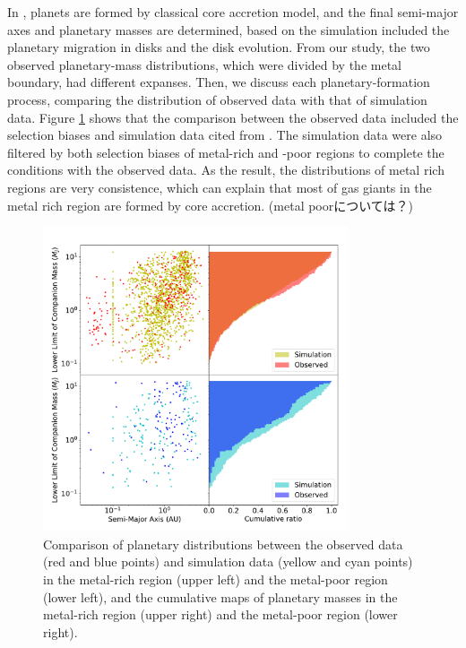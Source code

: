 \documentclass[twocolumn, dvipdfmx]{aastex62}
\begin{document}
\begin{CJK*}{UTF8}{min}
In \cite{2012A&A...541A..97M}, planets are formed by classical core accretion model, and the final semi-major axes and planetary masses are determined, based on the simulation included the planetary migration in disks and the disk evolution. From our study, the two observed planetary-mass distributions, which were divided by the metal boundary, had different expanses. Then, we discuss each planetary-formation process, comparing the distribution of observed data with that of simulation data. Figure \ref{fig:discussion} shows that the comparison between the observed data included the selection biases and simulation data cited from \cite{2012A&A...541A..97M}. The simulation data were also filtered by both selection biases of metal-rich and -poor regions to complete the conditions with the observed data. As the result, the distributions of metal rich regions are very consistence, which can explain that most of gas giants in the metal rich region are formed by core accretion. (metal poorについては？)

\begin{figure}[b]
\begin{center}
\includegraphics[width=9cm]{../../../Figure/discussion.pdf}
\caption{Comparison of planetary distributions between the observed data (red and blue points) and simulation data (yellow and cyan points) in the metal-rich region (upper left) and the metal-poor region (lower left), and the cumulative maps of planetary masses in the metal-rich region (upper right) and the metal-poor region (lower right). \label{fig:discussion}}
\end{center}
\end{figure}


\acknowledgments



\end{CJK*}
\end{document}
